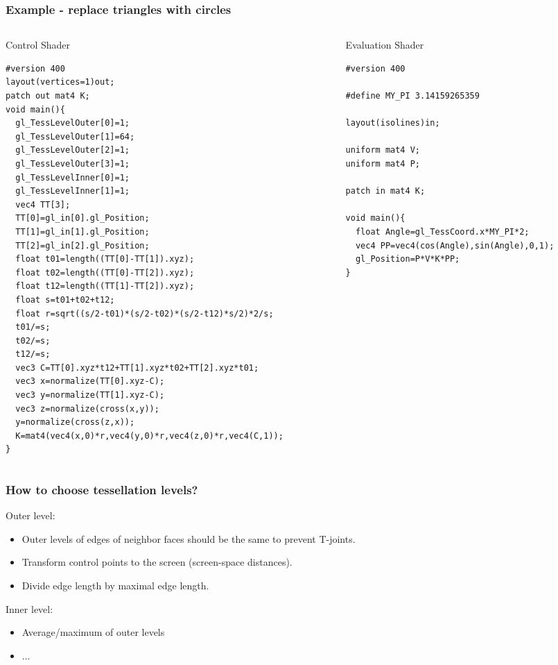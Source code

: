 \begin{frame}[fragile]
    \frametitle{Example - replace triangles with circles}
  \begin{columns}[T]
    \begin{column}{.44\textwidth}
      Control Shader
{\tiny
\begin{verbatim}
#version 400
layout(vertices=1)out;
patch out mat4 K;
void main(){
  gl_TessLevelOuter[0]=1;
  gl_TessLevelOuter[1]=64;
  gl_TessLevelOuter[2]=1;
  gl_TessLevelOuter[3]=1;
  gl_TessLevelInner[0]=1;
  gl_TessLevelInner[1]=1;
  vec4 TT[3];
  TT[0]=gl_in[0].gl_Position;
  TT[1]=gl_in[1].gl_Position;
  TT[2]=gl_in[2].gl_Position;
  float t01=length((TT[0]-TT[1]).xyz);
  float t02=length((TT[0]-TT[2]).xyz);
  float t12=length((TT[1]-TT[2]).xyz);
  float s=t01+t02+t12;
  float r=sqrt((s/2-t01)*(s/2-t02)*(s/2-t12)*s/2)*2/s;
  t01/=s;
  t02/=s;
  t12/=s;
  vec3 C=TT[0].xyz*t12+TT[1].xyz*t02+TT[2].xyz*t01;
  vec3 x=normalize(TT[0].xyz-C);
  vec3 y=normalize(TT[1].xyz-C);
  vec3 z=normalize(cross(x,y));
  y=normalize(cross(z,x));
  K=mat4(vec4(x,0)*r,vec4(y,0)*r,vec4(z,0)*r,vec4(C,1));
}
\end{verbatim}
}
    \end{column}
    \begin{column}{.48\textwidth}
      Evaluation Shader
{\tiny
\begin{verbatim}
#version 400

#define MY_PI 3.14159265359

layout(isolines)in;

uniform mat4 V;
uniform mat4 P;

patch in mat4 K;

void main(){
  float Angle=gl_TessCoord.x*MY_PI*2;
  vec4 PP=vec4(cos(Angle),sin(Angle),0,1);
  gl_Position=P*V*K*PP;
}
\end{verbatim}
}
    \end{column}
  \end{columns}

\end{frame}


\begin{frame}
\frametitle{How to choose tessellation levels?}
	Outer level:
	\begin{itemize}
	\item Outer levels of edges of neighbor faces should be the same to prevent T-joints.
  \item Transform control points to the screen (screen-space distances).
	\item Divide edge length by maximal edge length.
	\end{itemize}
	Inner level:
	\begin{itemize}
	\item Average/maximum of outer levels
  \item ...
	\end{itemize}
\end{frame}

